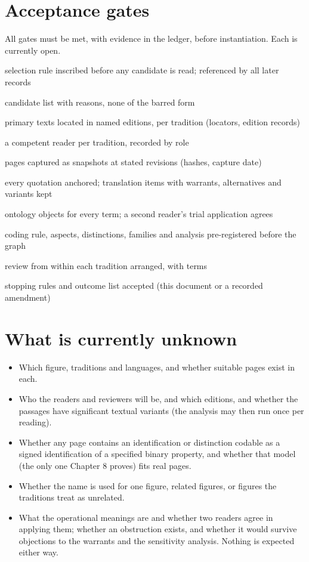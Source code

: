 \documentclass[11pt]{article}
\begin{document}
\section{Acceptance gates}\label{sec:gates}

All gates must be met, with evidence in the ledger, before instantiation. Each is currently open.

\begin{description}[nosep,leftmargin=2.6em,labelwidth=2.2em,labelsep=0.4em]
\item[G1] selection rule inscribed before any candidate is read; referenced by all later records
\item[G2] candidate list with reasons, none of the barred form
\item[G3] primary texts located in named editions, per tradition (locators, edition records)
\item[G4] a competent reader per tradition, recorded by role
\item[G5] pages captured as snapshots at stated revisions (hashes, capture date)
\item[G6] every quotation anchored; translation items with warrants, alternatives and variants kept
\item[G7] ontology objects for every term; a second reader's trial application agrees
\item[G8] coding rule, aspects, distinctions, families and analysis pre-registered before the graph
\item[G9] review from within each tradition arranged, with terms
\item[G10] stopping rules and outcome list accepted (this document or a recorded amendment)
\end{description}

\section{What is currently unknown}\label{sec:unknown}

\begin{itemize}[nosep]
\item Which figure, traditions and languages, and whether suitable pages exist in each.
\item Who the readers and reviewers will be, and which editions, and whether the passages have significant textual variants (the analysis may then run once per reading).
\item Whether any page contains an identification or distinction codable as a signed identification of a specified binary property, and whether that model (the only one Chapter 8 proves) fits real pages.
\item Whether the name is used for one figure, related figures, or figures the traditions treat as unrelated.
\item What the operational meanings are and whether two readers agree in applying them; whether an obstruction exists, and whether it would survive objections to the warrants and the sensitivity analysis. Nothing is expected either way.
\end{itemize}
\end{document}
